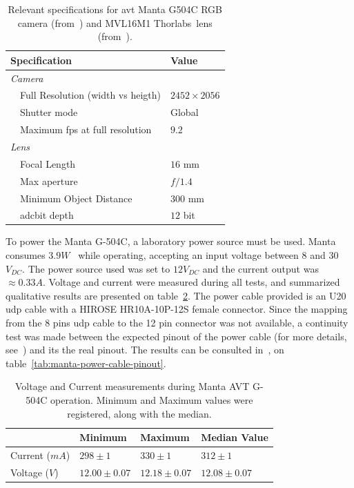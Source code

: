 \begin{table}[H]
	\renewcommand{\arraystretch}{1.2}
	\centering
	\begin{tabular}{@{}lp{7cm}l@{}}
		\toprule
		\multicolumn{2}{l}{Specification} & Value \\ \midrule
		\multicolumn{2}{l}{\emph{Camera}} & \\
		\phantom{a} & Full Resolution (width vs heigth) & $2452 \times 2056$   \\
									& Shutter mode & Global \\
									&	Maximum \ac{fps} at full resolution & $9.2$ \\ \midrule 
									\multicolumn{2}{l}{\emph{Lens}} \\
									&	Focal Length & $16$ mm \\
									&	Max aperture & $f/1.4$ \\
									&	Minimum Object Distance & $300$ mm  \\
									& \acs{adc}\footnotemark bit depth & $12$ bit \\
		\bottomrule
	\end{tabular}
	\caption{Relevant specifications for \ac{avt} Manta G504C RGB camera (from~\cite{MantaG504C})  and MVL16M1 Thorlabs\cp~lens (from~\cite{Thorlabs}).}
	\label{tab:camera-and-lens-specs}
\end{table}


To power the Manta G-504C, a laboratory power source must be used. Manta consumes $3.9 W$~\cite{MantaG504C} while operating, accepting an input voltage between $8$ and $30$ $V_{DC}$. The power source used was set to  $12 V_{DC}$ and the current output was $\approx 0.33A$. Voltage and current were measured during all tests, and summarized qualitative results are presented on table~\ref{tab:manta-power}. The power cable provided is an U20 \ac{udp} cable with a HIROSE HR10A-10P-12S female connector. Since the mapping from the 8 pins \ac{udp} cable to the 12 pin connector was not available, a continuity test was made between the expected pinout of the power cable (for more details, see~\cite{AVTCables}) and its the real pinout. The results can be consulted in~, on table~\ref{tab:manta-power-cable-pinout}.

	
\begin{table}[H]
	\centering
	\renewcommand{\arraystretch}{1.2}
	\renewcommand{\tabcolsep}{0.45cm}
	\begin{tabular}{@{}llll@{}}
		\toprule
					  & Minimum & Maximum & Median Value \\ \midrule
		Current ($mA$) & $298 \pm 1$ & $330\pm 1$ & $312 \pm 1$ \\
		Voltage ($V$)  & $12.00\pm 0.07 $ & $12.18\pm 0.07$ & $12.08\pm0.07$ \\
		\bottomrule
	\end{tabular}
	\centering
	\label{tab:manta-power}
	\caption{Voltage and Current measurements during Manta AVT G-504C operation. Minimum and Maximum values were registered, along with the median. }
\end{table}



